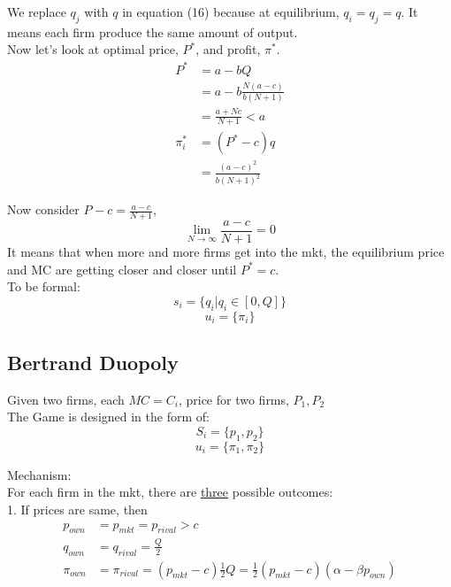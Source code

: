 \documentclass[12pt]{article}
\newcommand{\rr}[1]{^{#1}}
\newcommand{\uu}[1]{\underline{#1}}
\newcommand{\infinity}{\infty}
\newcommand{\Lim}[3]{\lim_{#1 \to #2} {#3}}
\newcommand{\e}[1]{$ #1 $}
\newcommand{\ee}[1]{$$ #1 $$}
\begin{document}
\begin{spacing}{1.5}
            We replace \e{q_j} with \e{q} in equation (16) because at equilibrium,
            \e{q_i = q_j = q}. It means each firm produce the same amount of output.\\
            Now let's look at optimal price, \e{P\rr{*}}, and profit, \e{\pi\rr{*}}.
            \begin{align}
                P\rr{*} & = a - bQ\\
                & = a - b\frac{N(a - c)}{b(N+1)}\\
                & = \frac{a+Nc}{N+1} < a\\
                \pi_i\rr{*} & = (P\rr{*} - c)q\\
                & = \frac{(a - c)\rr{2}}{b(N+1)\rr{2}}
            \end{align}

            Now consider \e{P\rr{} - c = \frac{a - c}{N+1}},
            \ee{\Lim{N}{\infinity}{\frac{a - c}{N+1}} = 0}
            It means that when more and more firms get into the mkt, the equilibrium
            price and MC are getting closer and closer until \e{P\rr{*} = c}.\\
            To be formal:
            \ee{s_i = \{q_i|q_i \in [0,Q]\}}
            \ee{u_i = \{\pi_i\}}
            

            


        \subsection{Bertrand Duopoly}

            Given two firms, each $MC = C_i$, price for two firms, $P_1, P_2$\\
            The Game is designed in the form of:
            $$ S_i = \{ p_1, p_2\} $$
            $$ u_i = \{ \pi_1, \pi_2 \}$$


            Mechanism:\\
            For each firm in the mkt, there are \uu{three} possible outcomes:\\
            1. If prices are same, then 
            \begin{align*}
                p_{own} & = p_{mkt} = p_{rival} > c\\
                q_{own} & = q_{rival} = \frac{Q}{2}\\
                \pi_{own} & = \pi_{rival} = (p_{mkt} - c)\frac{1}{2}Q = \frac{1}{2}(p_{mkt} - c)(\alpha - \beta p_{own})\\
            \end{align*}
        

\end{spacing}
\end{document}
